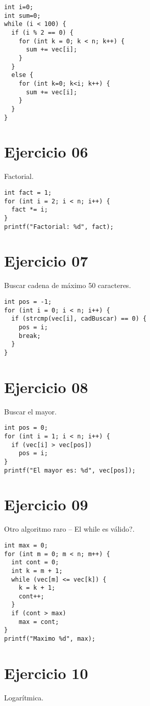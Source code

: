 \documentclass{article}
\begin{document}
\begin{lstlisting}
int i=0;
int sum=0;
while (i < 100) {
  if (i % 2 == 0) {
    for (int k = 0; k < n; k++) {
      sum += vec[i];
    }
  }
  else {
    for (int k=0; k<i; k++) {
      sum += vec[i];
    }
  }
}
\end{lstlisting}

\section{Ejercicio 06}
Factorial.

\begin{lstlisting}
int fact = 1;
for (int i = 2; i < n; i++) {
  fact *= i;
}
printf("Factorial: %d", fact);
\end{lstlisting}

\section{Ejercicio 07}
Buscar cadena de máximo 50 caracteres.

\begin{lstlisting}
int pos = -1;
for (int i = 0; i < n; i++) {
  if (strcmp(vec[i], cadBuscar) == 0) {
    pos = i;
    break;
  }
}
\end{lstlisting}

\section{Ejercicio 08}
Buscar el mayor.

\begin{lstlisting}
int pos = 0;
for (int i = 1; i < n; i++) {
  if (vec[i] > vec[pos])
    pos = i;
}
printf("El mayor es: %d", vec[pos]); 
\end{lstlisting}

\section{Ejercicio 09}
Otro algoritmo raro – El while es válido?.

\begin{lstlisting}
int max = 0;
for (int m = 0; m < n; m++) {
  int cont = 0;
  int k = m + 1;
  while (vec[m] <= vec[k]) {
    k = k + 1;
    cont++;
  }
  if (cont > max)
    max = cont;
}
printf("Maximo %d", max);
\end{lstlisting}

\section{Ejercicio 10}
Logarítmica.
\end{document}
